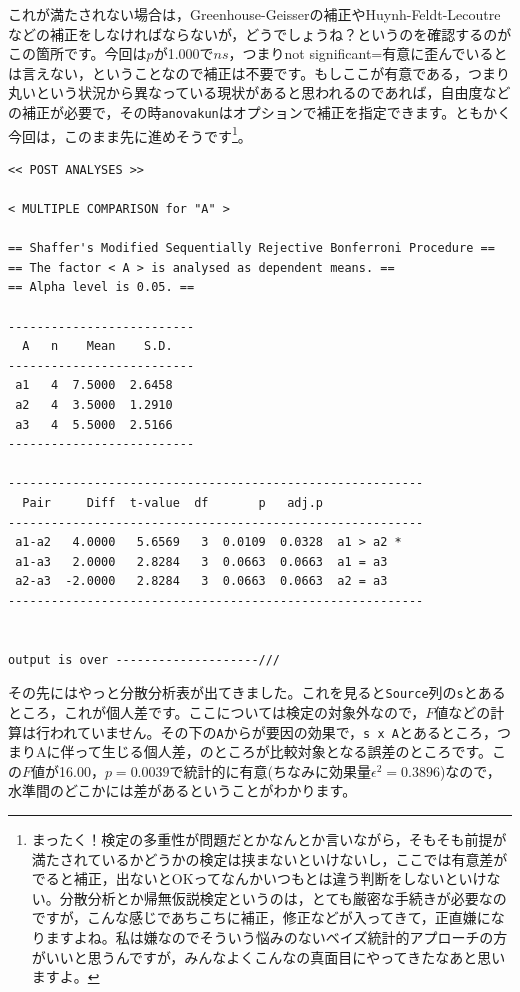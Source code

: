 \documentclass{ltjsarticle}
\begin{document}
これが満たされない場合は，Greenhouse-Geisserの補正やHuynh-Feldt-Lecoutreなどの補正をしなければならないが，どうでしょうね？というのを確認するのがこの箇所です。今回は$p$が1.000で$ns$，つまりnot significant=有意に歪んでいるとは言えない，ということなので補正は不要です。もしここが有意である，つまり丸いという状況から異なっている現状があると思われるのであれば，自由度などの補正が必要で，その時\texttt{anovakun}はオプションで補正を指定できます。ともかく今回は，このまま先に進めそうです\footnote{まったく！検定の多重性が問題だとかなんとか言いながら，そもそも前提が満たされているかどうかの検定は挟まないといけないし，ここでは有意差がでると補正，出ないとOKってなんかいつもとは違う判断をしないといけない。分散分析とか帰無仮説検定というのは，とても厳密な手続きが必要なのですが，こんな感じであちこちに補正，修正などが入ってきて，正直嫌になりますよね。私は嫌なのでそういう悩みのないベイズ統計的アプローチの方がいいと思うんですが，みんなよくこんなの真面目にやってきたなあと思いますよ。}。

\begin{tcolorbox}
    \begin{verbatim}
<< POST ANALYSES >>

< MULTIPLE COMPARISON for "A" >

== Shaffer's Modified Sequentially Rejective Bonferroni Procedure ==
== The factor < A > is analysed as dependent means. == 
== Alpha level is 0.05. == 
 
--------------------------
  A   n    Mean    S.D. 
--------------------------
 a1   4  7.5000  2.6458 
 a2   4  3.5000  1.2910 
 a3   4  5.5000  2.5166 
--------------------------

----------------------------------------------------------
  Pair     Diff  t-value  df       p   adj.p            
----------------------------------------------------------
 a1-a2   4.0000   5.6569   3  0.0109  0.0328  a1 > a2 * 
 a1-a3   2.0000   2.8284   3  0.0663  0.0663  a1 = a3   
 a2-a3  -2.0000   2.8284   3  0.0663  0.0663  a2 = a3   
----------------------------------------------------------


output is over --------------------///

\end{verbatim}
\end{tcolorbox}
その先にはやっと分散分析表が出てきました。これを見ると\texttt{Source}列の\texttt{s}とあるところ，これが個人差です。ここについては検定の対象外なので，$F$値などの計算は行われていません。その下の\texttt{A}からが要因の効果で，\texttt{s x A}とあるところ，つまりAに伴って生じる個人差，のところが比較対象となる誤差のところです。この$F$値が16.00，$p=0.0039$で統計的に有意(ちなみに効果量$\epsilon^2=0.3896$)なので，水準間のどこかには差があるということがわかります。
\end{document}

